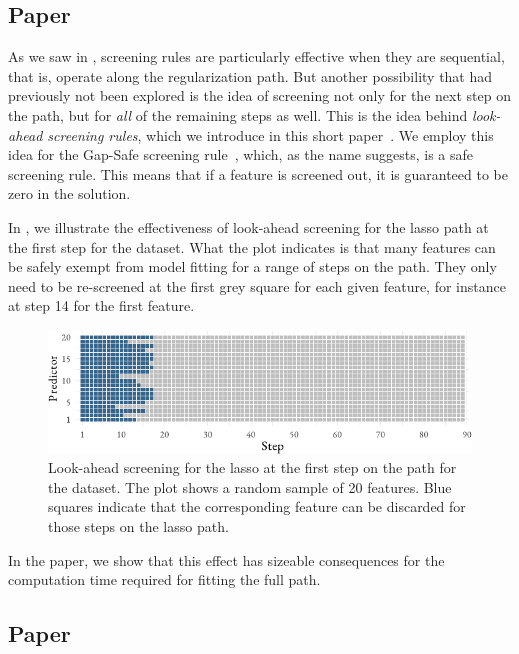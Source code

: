 \subsection{Paper \II}

As we saw in , screening rules are particularly effective when they are sequential, that is, operate along the regularization path. But another possibility that had previously not been explored is the idea of screening not only for the next step on the path, but for \emph{all} of the remaining steps as well. This is the idea behind \emph{look-ahead screening rules}, which we introduce in this short paper~\parencite{larsson2021}. We employ this idea for the Gap-Safe screening rule~\parencite{ndiaye2017}, which, as the name suggests, is a safe screening rule. This means that if a feature is screened out, it is guaranteed to be zero in the solution.

In , we illustrate the effectiveness of look-ahead screening for the lasso path at the first step for the  dataset. What the plot indicates is that many features can be safely exempt from model fitting for a range of steps on the path. They only need to be re-screened at the first grey square for each given feature, for instance at step 14 for the first feature.

\begin{figure}[tpb]
  \centering
  \includegraphics[]{figures/paper2-highlight.pdf}
  \caption{%
    Look-ahead screening for the lasso at the first step on the path for the  dataset. The plot shows a random sample of 20 features. Blue squares indicate that the corresponding feature can be discarded for those steps on the lasso path.
  }
  \label{fig:paper2-highlight}
\end{figure}

In the paper, we show that this effect has sizeable consequences for the computation time required for fitting the full path.

\subsection{Paper \III}

